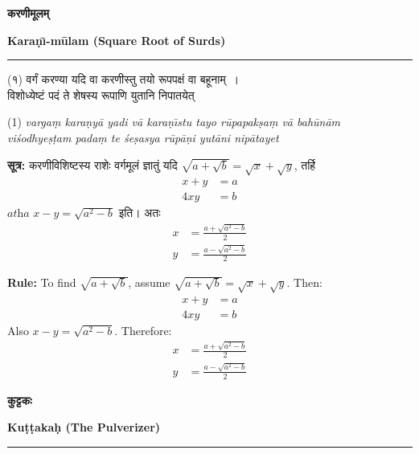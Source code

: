 \documentclass[11pt,a4paper]{article}
\newcommand{\dev}[1]{{\devanagarifont #1}}
\newcommand{\bicol}[2]{%
\noindent%
\begin{minipage}[t]{0.48\textwidth}
\begin{flushleft}
\small
#1
\end{flushleft}
\end{minipage}%
\hfill%
\begin{minipage}[t]{0.48\textwidth}
\begin{flushleft}
\small
#2
\end{flushleft}
\end{minipage}%
\vspace{0.4em}
}
\newcommand{\bicolverse}[2]{%
\par\noindent%
\begin{minipage}[t]{0.48\textwidth}
\centering
\color{versecolor}
\devanagarifont
\small
#1
\end{minipage}%
\hfill%
\begin{minipage}[t]{0.48\textwidth}
\centering
\color{versecolor}
\small
#2
\end{minipage}%
\par\vspace{0.4em}
}
\newcommand{\sectionbicol}[2]{%
\vspace{0.5em}
\noindent%
\begin{minipage}[t]{0.48\textwidth}
\begin{center}
\large\bfseries\color{sectioncolor}
\dev{#1}
\end{center}
\end{minipage}%
\hfill%
\begin{minipage}[t]{0.48\textwidth}
\begin{center}
\large\bfseries\color{sectioncolor}
#2
\end{center}
\end{minipage}%
\vspace{0.3em}
\noindent\rule{\textwidth}{0.4pt}
}
\begin{document}
\clearpage

\sectionbicol{करणीमूलम्}{Kara\d{n}\={\i}-m\={u}lam (Square Root of Surds)}

\vspace{0.3cm}

\bicolverse{%
(१) वर्गं करण्या यदि वा करणीस्तु तयो रूपपक्षं वा बहूनाम्~।\\
विशोध्येष्टं पदं ते शेषस्य रूपाणि युतानि निपातयेत्~
}{%
(1) \textit{varga\d{m} kara\d{n}y\={a} yadi v\={a} kara\d{n}\={\i}stu tayo r\={u}papak\d{s}a\d{m} v\={a} bah\={u}n\={a}m}\\
\textit{vi\'{s}odhye\d{s}\d{t}am pada\d{m} te \'{s}e\d{s}asya r\={u}p\={a}\d{n}i yut\={a}ni nip\={a}tayet}
}

\vspace{0.5cm}

\bicol{%
\textbf{सूत्र:} करणीविशिष्टस्य राशेः वर्गमूलं ज्ञातुं यदि $\sqrt{a + \sqrt{b}} = \sqrt{x} + \sqrt{y}$, तर्हि
\begin{align*}
x + y &= a \\
4xy &= b
\end{align*}
$\textit{atha } x - y = \sqrt{a^2 - b}$ इति। अतः
\begin{align*}
x &= \frac{a + \sqrt{a^2 - b}}{2} \\
y &= \frac{a - \sqrt{a^2 - b}}{2}
\end{align*}
}{%
\textbf{Rule:} To find $\sqrt{a + \sqrt{b}}$, assume $\sqrt{a + \sqrt{b}} = \sqrt{x} + \sqrt{y}$. Then:
\begin{align*}
x + y &= a \\
4xy &= b
\end{align*}
Also $x - y = \sqrt{a^2 - b}$. Therefore:
\begin{align*}
x &= \frac{a + \sqrt{a^2 - b}}{2} \\
y &= \frac{a - \sqrt{a^2 - b}}{2}
\end{align*}
}

\clearpage

\sectionbicol{कुट्टकः}{Ku\d{t}\d{t}aka\d{h} (The Pulverizer)}

\vspace{0.3cm}
\end{document}
